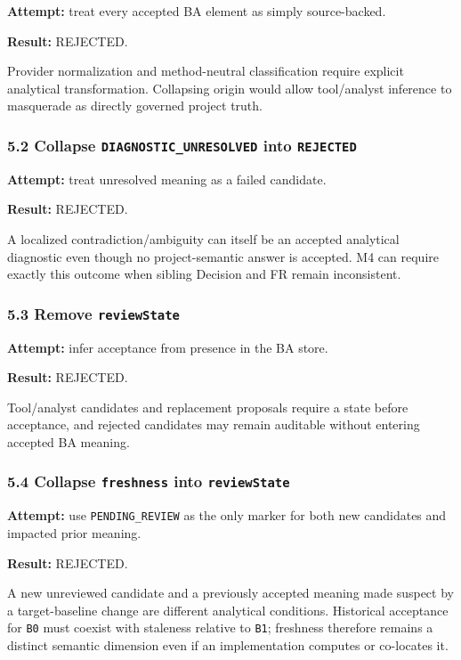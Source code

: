 \documentclass[11pt,a4paper]{article}
\begin{document}
\textbf{Attempt:} treat every accepted BA element as simply source-backed.

\textbf{Result:} REJECTED.

Provider normalization and method-neutral classification require explicit analytical transformation. Collapsing origin would allow tool/analyst inference to masquerade as directly governed project truth.

\subsubsection{\texorpdfstring{5.2 Collapse \texttt{DIAGNOSTIC\_UNRESOLVED} into \texttt{REJECTED}}{5.2 Collapse DIAGNOSTIC\_UNRESOLVED into REJECTED}}\label{collapse-diagnostic_unresolved-into-rejected}

\textbf{Attempt:} treat unresolved meaning as a failed candidate.

\textbf{Result:} REJECTED.

A localized contradiction/ambiguity can itself be an accepted analytical diagnostic even though no project-semantic answer is accepted. M4 can require exactly this outcome when sibling Decision and FR remain inconsistent.

\subsubsection{\texorpdfstring{5.3 Remove \texttt{reviewState}}{5.3 Remove reviewState}}\label{remove-reviewstate}

\textbf{Attempt:} infer acceptance from presence in the BA store.

\textbf{Result:} REJECTED.

Tool/analyst candidates and replacement proposals require a state before acceptance, and rejected candidates may remain auditable without entering accepted BA meaning.

\subsubsection{\texorpdfstring{5.4 Collapse \texttt{freshness} into \texttt{reviewState}}{5.4 Collapse freshness into reviewState}}\label{collapse-freshness-into-reviewstate}

\textbf{Attempt:} use \texttt{PENDING\_REVIEW} as the only marker for both new candidates and impacted prior meaning.

\textbf{Result:} REJECTED.

A new unreviewed candidate and a previously accepted meaning made suspect by a target-baseline change are different analytical conditions. Historical acceptance for \texttt{B0} must coexist with staleness relative to \texttt{B1}; freshness therefore remains a distinct semantic dimension even if an implementation computes or co-locates it.
\end{document}
